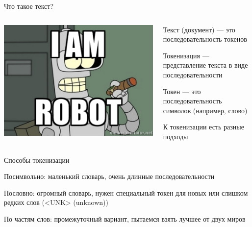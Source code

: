 \documentclass[notes,12pt, aspectratio=169]{beamer}
\newenvironment{wideitemize}{\itemize\addtolength{\itemsep}{10pt}}{\enditemize}
\begin{document}
\begin{frame}{Что такое текст?}
\begin{columns}
\begin{column}{.48\linewidth}
	\includegraphics[scale=0.3]{bender.png}
\end{column}

	\begin{column}{.48\linewidth}
\begin{wideitemize} 
	\item  Текст (документ) —  это последовательность токенов
	\item  Токенизация — представление текста в виде последовательности
	\item  Токен —  это последовательность символов (например, слово)
	\item  К токенизации есть разные подходы
\end{wideitemize}
	\end{column}	
\end{columns}
\end{frame} 

\begin{frame}{Способы токенизации}
	\begin{wideitemize} 
		\item  \alert{Посимвольно:} маленький словарь, очень длинные последовательности
		\item  \alert{Пословно:} огромный словарь, нужен специальный токен  для новых или слишком редких слов (<UNK> (unknown))
		\item  \alert{По частям слов:} промежуточный вариант, пытаемся взять лучшее от двух миров
	\end{wideitemize}
\end{frame} 
\end{document}
